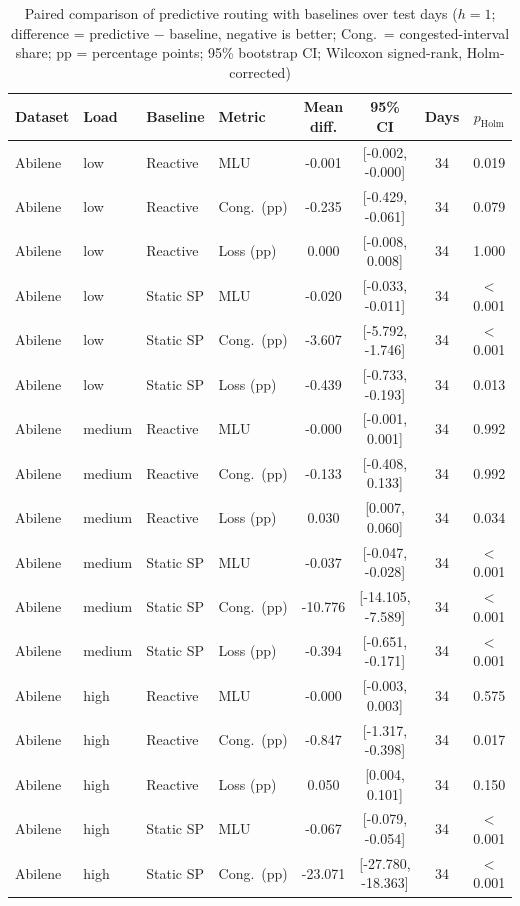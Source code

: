 \begin{table}[t]
\centering
\caption{Paired comparison of predictive routing with baselines over test days ($h=1$; difference = predictive $-$ baseline, negative is better; Cong.\ = congested-interval share; pp = percentage points; 95\% bootstrap CI; Wilcoxon signed-rank, Holm-corrected)}
\label{tab:stats}
\scriptsize\setlength{\tabcolsep}{2.5pt}
\begin{tabular}{@{}llllcccc@{}}
\toprule
Dataset & Load & Baseline & Metric & Mean diff. & 95\% CI & Days & $p_{\mathrm{Holm}}$ \\
\midrule
Abilene & low & Reactive & MLU & -0.001 & [-0.002, -0.000] & 34 & 0.019 \\
Abilene & low & Reactive & Cong.\ (pp) & -0.235 & [-0.429, -0.061] & 34 & 0.079 \\
Abilene & low & Reactive & Loss (pp) & 0.000 & [-0.008, 0.008] & 34 & 1.000 \\
Abilene & low & Static SP & MLU & -0.020 & [-0.033, -0.011] & 34 & $<$0.001 \\
Abilene & low & Static SP & Cong.\ (pp) & -3.607 & [-5.792, -1.746] & 34 & $<$0.001 \\
Abilene & low & Static SP & Loss (pp) & -0.439 & [-0.733, -0.193] & 34 & 0.013 \\
Abilene & medium & Reactive & MLU & -0.000 & [-0.001, 0.001] & 34 & 0.992 \\
Abilene & medium & Reactive & Cong.\ (pp) & -0.133 & [-0.408, 0.133] & 34 & 0.992 \\
Abilene & medium & Reactive & Loss (pp) & 0.030 & [0.007, 0.060] & 34 & 0.034 \\
Abilene & medium & Static SP & MLU & -0.037 & [-0.047, -0.028] & 34 & $<$0.001 \\
Abilene & medium & Static SP & Cong.\ (pp) & -10.776 & [-14.105, -7.589] & 34 & $<$0.001 \\
Abilene & medium & Static SP & Loss (pp) & -0.394 & [-0.651, -0.171] & 34 & $<$0.001 \\
Abilene & high & Reactive & MLU & -0.000 & [-0.003, 0.003] & 34 & 0.575 \\
Abilene & high & Reactive & Cong.\ (pp) & -0.847 & [-1.317, -0.398] & 34 & 0.017 \\
Abilene & high & Reactive & Loss (pp) & 0.050 & [0.004, 0.101] & 34 & 0.150 \\
Abilene & high & Static SP & MLU & -0.067 & [-0.079, -0.054] & 34 & $<$0.001 \\
Abilene & high & Static SP & Cong.\ (pp) & -23.071 & [-27.780, -18.363] & 34 & $<$0.001 \\

\end{tabular}
\end{table}
